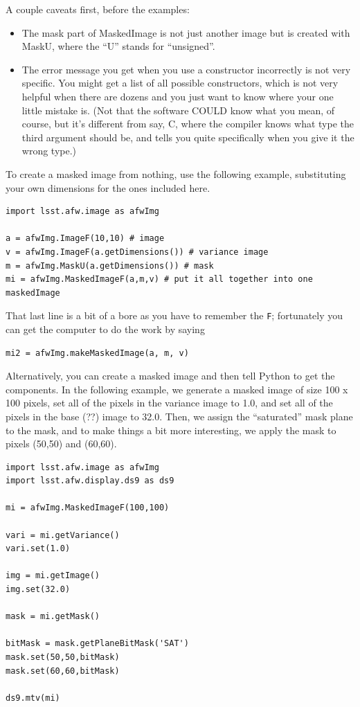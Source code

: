 A couple caveats first, before the examples:
\begin{itemize}
\item The mask part of MaskedImage is not just another image but
is created with MaskU, where the ``U'' stands for ``unsigned''.
\item The error message you get when you use a constructor
incorrectly is not very specific.  You might get a list of all
possible constructors, which is not very helpful when there
are dozens and you just want to know where your one little mistake
is.  (Not that the software COULD know what you mean, of course,
but it's different from say, C, where the compiler knows what type
the third argument should be, and tells you quite specifically when you
give it the wrong type.)
\end{itemize}

To create a masked image from nothing, use the following example, substituting your own dimensions for the ones included here.

\begin{verbatim}
import lsst.afw.image as afwImg

a = afwImg.ImageF(10,10) # image
v = afwImg.ImageF(a.getDimensions()) # variance image
m = afwImg.MaskU(a.getDimensions()) # mask
mi = afwImg.MaskedImageF(a,m,v) # put it all together into one maskedImage
\end{verbatim}

That last line is a bit of a bore as you have to remember the \verb|F|;  fortunately you can get the computer to do the work by saying
\begin{verbatim}
mi2 = afwImg.makeMaskedImage(a, m, v)
\end{verbatim}

Alternatively, you can create a masked image and then tell Python to get the components.  In the following example, we generate a masked image of size 100 x 100 pixels, set all of the pixels in the variance image to 1.0, and set all of the pixels in the base (??) image to 32.0.  Then, we assign the ``saturated'' mask plane to the mask, and to make things a bit more interesting, we apply the mask to pixels (50,50) and (60,60).  

\begin{verbatim}
import lsst.afw.image as afwImg
import lsst.afw.display.ds9 as ds9

mi = afwImg.MaskedImageF(100,100)

vari = mi.getVariance()
vari.set(1.0)

img = mi.getImage()
img.set(32.0)

mask = mi.getMask()

bitMask = mask.getPlaneBitMask('SAT')
mask.set(50,50,bitMask)
mask.set(60,60,bitMask)

ds9.mtv(mi)
\end{verbatim}

